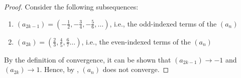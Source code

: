 \begin{problem}
\begin{proof}
    Consider the following subsequences:
    \begin{enumerate}[label=(\roman*)]
      \item $(a_{2k - 1}) = (-\frac{1}{2}, -\frac{3}{4}, -\frac{5}{6}, \ldots)$, i.e., the odd-indexed terms of the $(a_{n})$
      \item $(a_{2k}) = (\frac{2}{3}, \frac{4}{5}, \frac{6}{7} \ldots)$, i.e., the even-indexed terms of the $(a_{n})$
    \end{enumerate}
    By the definition of convergence, it can be shown that $(a_{2k - 1}) \to -1$ and $(a_{2k}) \to 1$.
    Hence, by , $(a_{n})$ does not converge.
  \end{proof}


\end{problem}
